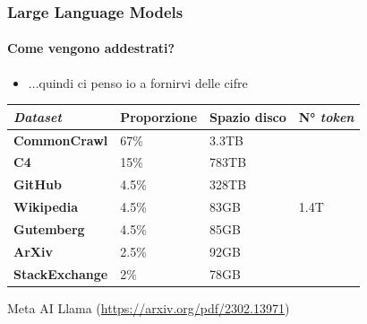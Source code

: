 %
\begin{frame}[t] \frametitle{Large Language Models}
\framesubtitle{Come vengono addestrati?}
{\scriptsize
{}
    \begin{minipage}[t]{\textwidth}
        \vspace*{-.5cm}
        \begin{itemize}[leftmargin=10pt,align=right]
            \item[\alert{\faArrowCircleRight}] $\ldots$quindi ci penso io a fornirvi delle cifre
        \end{itemize}
    \end{minipage}
    \begin{minipage}[t]{\textwidth}
        \begin{minipage}[t]{.49\textwidth}
            \vspace*{-.5cm}
            {\tiny
                \begin{table}
                    \renewcommand{\arraystretch}{1}
                    \centering
                    \begin{tabularx}{\textwidth}{Xp{.9cm}p{1cm}p{.7cm}}
                        \toprule
                        \textbf{\emph{Dataset}} & \textbf{Proporzione} & \textbf{Spazio disco} & N° \emph{token}\\
                        \midrule
                        \textbf{CommonCrawl} & 67\% & 3.3TB & \multirow{7}{*}{1.4T}\\
                        \textbf{C4} & 15\% & 783TB &\\
                        \textbf{GitHub} & 4.5\% & 328TB &\\
                        \textbf{Wikipedia} & 4.5\% & 83GB &\\
                        \textbf{Gutemberg} & 4.5\% & 85GB &\\
                        \textbf{ArXiv} & 2.5\% & 92GB &\\
                        \textbf{StackExchange} & 2\% & 78GB &\\
                        \bottomrule
                    \end{tabularx}
                    Meta AI Llama (\url{https://arxiv.org/pdf/2302.13971})
                \end{table}
            }
        \end{minipage}
        \begin{minipage}[t]{.49\textwidth}

\end{minipage}
\end{minipage}}
\end{frame}
